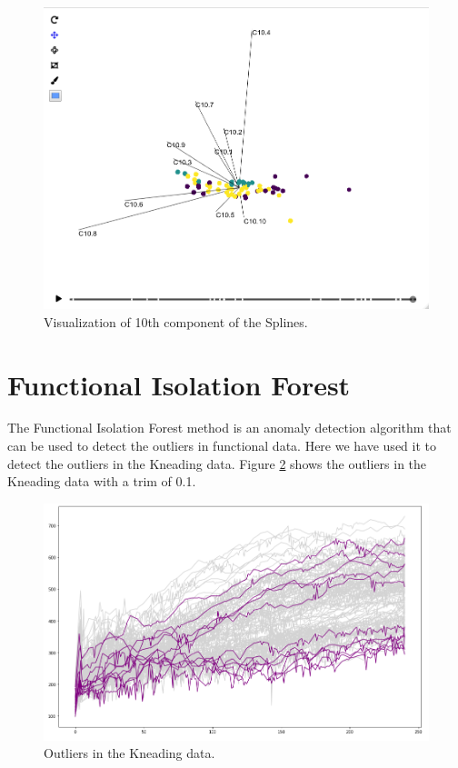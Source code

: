 \documentclass[]{article}
\begin{document}
\begin{figure}
	\centering
	\includegraphics[scale=0.35]{spline_10.png}
	\caption{Visualization of 10th component of the Splines.}
	\label{fig:spline_10}
\end{figure}



\section{Functional Isolation Forest}
The Functional Isolation Forest method is an anomaly detection algorithm that can be used to detect the outliers in functional data. Here we have used it to detect the outliers in the Kneading data. Figure \ref{fig:kneading_outliers} shows the outliers in the Kneading data with a trim of 0.1.

\begin{figure}
	\centering
	\includegraphics[scale=0.35]{kneading_outliers.png}
	\caption{Outliers in the Kneading data.}
	\label{fig:kneading_outliers}
\end{figure}
\end{document}
